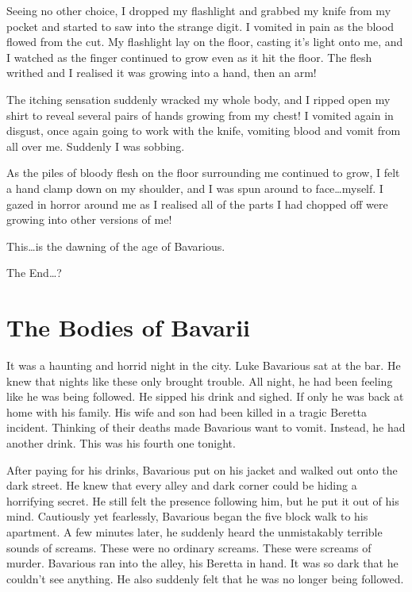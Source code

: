 Seeing no other choice, I dropped my flashlight and grabbed my
knife from my pocket and started to saw into the strange digit. I
vomited in pain as the blood flowed from the cut. My flashlight lay
on the floor, casting it's light onto me, and I watched as the
finger continued to grow even as it hit the floor. The flesh
writhed and I realised it was growing into a hand, then an
arm!



The itching sensation suddenly wracked my whole body, and I ripped
open my shirt to reveal several pairs of hands growing from my
chest! I vomited again in disgust, once again going to work with
the knife, vomiting blood and vomit from all over me. Suddenly I
was sobbing.



As the piles of bloody flesh on the floor surrounding me continued
to grow, I felt a hand clamp down on my shoulder, and I was spun
around to face{\ldots}myself. I gazed in horror around me as I realised
all of the parts I had chopped off were growing into other versions
of me!



This{\ldots}is the dawning of the age of Bavarious.



The End{\ldots}? 
 





\chapter{The Bodies of Bavarii}



It was a haunting and horrid night in the city. Luke Bavarious sat
at the bar. He knew that nights like these only brought trouble.
All night, he had been feeling like he was being followed. He
sipped his drink and sighed. If only he was back at home with his
family. His wife and son had been killed in a tragic Beretta
incident. Thinking of their deaths made Bavarious want to vomit.
Instead, he had another drink. This was his fourth one
tonight.



After paying for his drinks, Bavarious put on his jacket and walked
out onto the dark street. He knew that every alley and dark corner
could be hiding a horrifying secret. He still felt the presence
following him, but he put it out of his mind. Cautiously yet
fearlessly, Bavarious began the five block walk to his apartment. A
few minutes later, he suddenly heard the unmistakably terrible
sounds of screams. These were no ordinary screams. These were
screams of murder. Bavarious ran into the alley, his Beretta in
hand. It was so dark that he couldn't see anything. He also
suddenly felt that he was no longer being followed.



